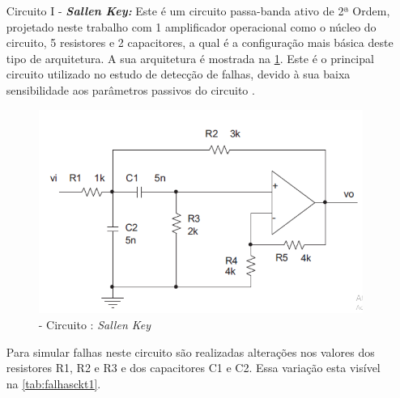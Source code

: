 \begin{enumerate}
    \item[Circuito I - ] \textbf{\textit{Sallen Key:}} Este é um circuito passa-banda ativo de 2ª Ordem, projetado neste trabalho com 1 amplificador operacional como o núcleo do circuito, 5 resistores e 2 capacitores, a qual é a configuração mais básica deste tipo de arquitetura. A sua arquitetura é mostrada na \ref{fig:Circuito1}. Este é o principal circuito utilizado no estudo de detecção de falhas, devido à sua baixa sensibilidade aos parâmetros passivos do circuito \cite{Cbrn2009}. 


\begin{figure}[H]
\begin{center}
\includegraphics[width=12cm]{./04_Cap4/figures/sallenckt.png}
\caption{\label{fig:Circuito1}- Circuito :{\textit{ Sallen Key}}}
\end{center}
\end{figure}

 
Para simular falhas neste circuito são realizadas alterações nos valores dos resistores R1, R2 e R3  e dos capacitores C1 e C2. Essa variação esta visível na \ref{tab:falhasckt1}.


\end{enumerate}
